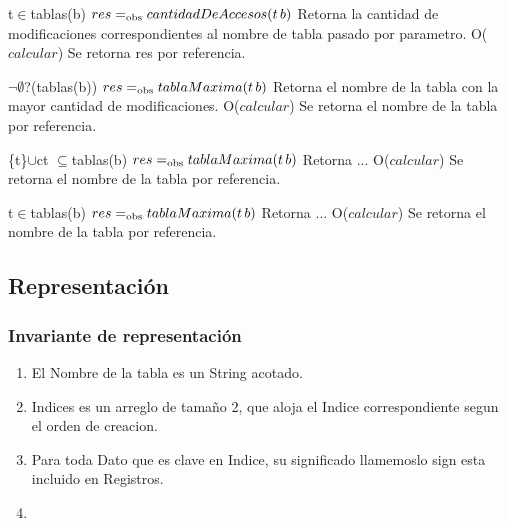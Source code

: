  {t$\in$tablas(b)}
 {$res =_{\mathrm{obs}} cantidadDeAccesos(t\,b)$}
 {Retorna la cantidad de modificaciones correspondientes al nombre de tabla pasado por parametro.}
 {O($calcular$)}
 {Se retorna res por referencia.} 

 {$\neg\emptyset$?(tablas(b))}
 {$res =_{\mathrm{obs}} tablaMaxima(t\,b)$}
 {Retorna el nombre de la tabla con la mayor cantidad de modificaciones.}
 {O($calcular$)}
 {Se retorna el nombre de la tabla por referencia.} 
  
 {\{t\}$\cup$ct $\subseteq$tablas(b)}
 {$res =_{\mathrm{obs}} tablaMaxima(t\,b)$}
 {Retorna ...}
 {O($calcular$)}
 {Se retorna el nombre de la tabla por referencia.}
  
 {t$\in$tablas(b)}
 {$res =_{\mathrm{obs}} tablaMaxima(t\,b)$}
 {Retorna ...}
 {O($calcular$)}
 {Se retorna el nombre de la tabla por referencia.}
  
 
 
\subsection{Representación}


\subsubsection*{Invariante de representación}

\begin{enumerate}
  \item El Nombre de la tabla es un String acotado.
  \item Indices es un arreglo de tamaño 2, que aloja el Indice correspondiente segun el orden de creacion.
  \item Para toda Dato que es clave en Indice, su significado llamemoslo sign esta incluido en Registros.
  \item 

\end{enumerate}


